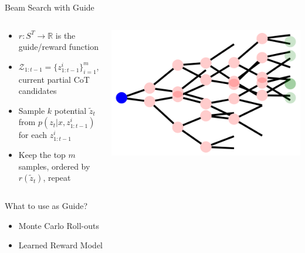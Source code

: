 \documentclass[14pt,aspectratio=169]{beamer}
\begin{document}
\begin{frame}{Beam Search with Guide}
	\begin{columns}
		\begin{column}{0.5\linewidth}
			\begin{itemize}
                \item $r: S^T \rightarrow \mathbb{R}$ is the guide/reward function
                \item $\mathcal{Z}_{1:t-1}=\{z^i_{1:t-1}\}_{i=1}^m$, current partial CoT candidates
                \item Sample $k$ potential $\tilde{z}_t$ from $p(z_{t} | x, z^i_{1:t-1})$ for each $z^i_{1:t-1}$
				\item Keep the top $m$ samples, ordered by $r(\tilde{z}_{t})$, repeat
			\end{itemize}
		\end{column}
		\begin{column}{0.5\linewidth}
			\includegraphics[width=\textwidth]{images/beam.png}
		\end{column}
	\end{columns}
\end{frame}


\begin{frame}{What to use as Guide?}
	\begin{itemize}
		\item Monte Carlo Roll-outs
		\item Learned Reward Model
	\end{itemize}
\end{frame}
\end{document}
